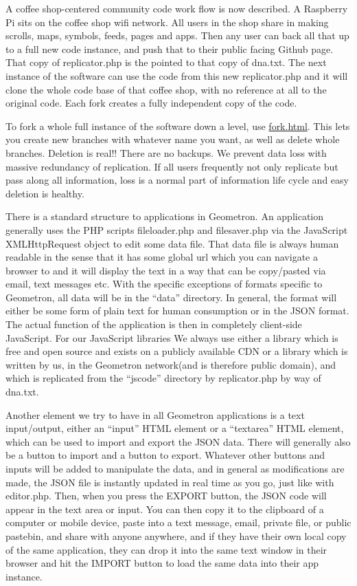 A coffee shop-centered community code work flow is now described. A
Raspberry Pi sits on the coffee shop wifi network. All users in the shop
share in making scrolls, maps, symbols, feeds, pages and apps. Then any
user can back all that up to a full new code instance, and push that to
their public facing Github page. That copy of replicator.php is the
pointed to that copy of dna.txt. The next instance of the software can
use the code from this new replicator.php and it will clone the whole
code base of that coffee shop, with no reference at all to the original
code. Each fork creates a fully independent copy of the code.

To fork a whole full instance of the software down a level, use
\url{fork.html}. This lets you create new branches with whatever name
you want, as well as delete whole branches. Deletion is real!! There are
no backups. We prevent data loss with massive redundancy of replication.
If all users frequently not only replicate but pass along all
information, loss is a normal part of information life cycle and easy
deletion is healthy.

There is a standard structure to applications in Geometron.  An application generally uses the PHP scripts fileloader.php and filesaver.php via the JavaScript XMLHttpRequest object to edit some data file.  That data file is always human readable in the sense that it has some global url which you can navigate a browser to and it will display the text in a way that can be copy/pasted via email, text messages etc. With the specific exceptions of formats specific to Geometron, all data will be in the ``data'' directory.  In general, the format will either be some form of plain text for human consumption or in the JSON format.  The actual function of the application is then in completely client-side JavaScript.  For our JavaScript libraries We always use either a library which is free and open source and exists on a publicly available CDN or a library which is written by us, in the Geometron network(and is therefore public domain), and which is replicated from the ``jscode'' directory by replicator.php by way of dna.txt.   

Another element we try to have in all Geometron applications is a text input/output, either an ``input'' HTML element or a ``textarea'' HTML element, which can be used to import and export the JSON data. There will generally also be a button to import and a button to export.  Whatever other buttons and inputs will be added to manipulate the data, and in general as modifications are made, the JSON file is instantly updated in real time as you go, just like with editor.php.  Then, when you press the EXPORT button, the JSON code will appear in the text area or input.  You can then copy it to the clipboard of a computer or mobile device, paste into a text message, email, private file, or public pastebin, and share with anyone anywhere, and if they have their own local copy of the same application, they can drop it into the same text window in their browser and hit the IMPORT button to load the same data into their app instance.  

